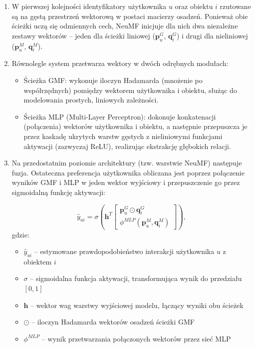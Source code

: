 \begin{enumerate}
    \item W pierwszej kolejności identyfikatory użytkownika $u$ oraz obiektu $i$ rzutowane są na gęstą przestrzeń wektorową w postaci macierzy osadzeń. Ponieważ obie ścieżki uczą się odmiennych cech, NeuMF inicjuje dla nich dwa niezależne zestawy wektorów -- jeden dla ścieżki liniowej ($\mathbf{p}_u^G$, $\mathbf{q}_i^G$) i drugi dla nieliniowej ($\mathbf{p}_u^M$, $\mathbf{q}_i^M$).

    \item Równolegle system przetwarza wektory w dwóch odrębnych modułach:
          \begin{itemize}
              \item Ścieżka GMF: wykonuje iloczyn Hadamarda (mnożenie po współrzędnych) pomiędzy wektorem użytkownika i obiektu, służąc do modelowania prostych, liniowych zależności.
              \item Ścieżka MLP (Multi-Layer Perceptron): dokonuje konkatenacji (połączenia) wektorów użytkownika i obiektu, a następnie przepuszcza je przez kaskadę ukrytych warstw gęstych z nieliniowymi funkcjami aktywacji (zazwyczaj ReLU), realizując ekstrakcję głębokich relacji.
          \end{itemize}

    \item Na przedostatnim poziomie architektury (tzw. warstwie NeuMF) następuje fuzja. Ostateczna preferencja użytkownika obliczana jest poprzez połączenie wyników GMF i MLP w jeden wektor wyjściowy i przepuszczenie go przez sigmoidalną funkcję aktywacji:

          \begin{equation}
              \hat{y}_{ui} = \sigma \left( \mathbf{h}^T \begin{bmatrix} \mathbf{p}_u^G \odot \mathbf{q}_i^G \\ \phi^{MLP}(\mathbf{p}_u^M, \mathbf{q}_i^M) \end{bmatrix} \right)
              \label{eq:neumf_pred},
          \end{equation}
          gdzie:
          \begin{itemize}
              \item $\hat{y}_{ui}$ -- estymowane prawdopodobieństwo interakcji użytkownika $u$ z obiektem $i$
              \item $\sigma$ -- sigmoidalna funkcja aktywacji, transformująca wynik do przedziału $[0, 1]$
              \item $\mathbf{h}$ -- wektor wag warstwy wyjściowej modelu, łączący wyniki obu ścieżek
              \item $\odot$ -- iloczyn Hadamarda wektorów osadzeń ścieżki GMF
              \item $\phi^{MLP}$ -- wynik przetwarzania połączonych wektorów przez sieć MLP
          \end{itemize}


\end{enumerate}

